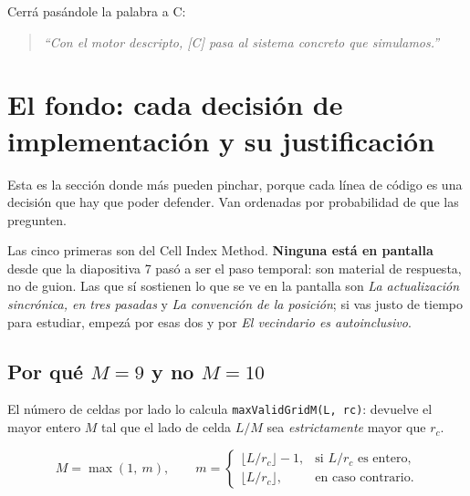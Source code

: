 \documentclass[11pt]{article}
\begin{document}


Cerrá pasándole la palabra a C:

\begin{quote}
\itshape
``Con el motor descripto, [C] pasa al sistema concreto que simulamos.''
\end{quote}

\section{El fondo: cada decisión de implementación y su justificación}

Esta es la sección donde más pueden pinchar, porque cada línea de código es una
decisión que hay que poder defender. Van ordenadas por probabilidad de que las
pregunten.

Las cinco primeras son del Cell Index Method. \textbf{Ninguna está en pantalla}
desde que la diapositiva 7 pasó a ser el paso temporal: son material de
respuesta, no de guion. Las que sí sostienen lo que se ve en la pantalla son
\emph{La actualización sincrónica, en tres pasadas} y \emph{La convención de la
posición}; si vas justo de tiempo para estudiar, empezá por esas dos y por
\emph{El vecindario es autoinclusivo}.

\subsection{Por qué $M = 9$ y no $M = 10$}

El número de celdas por lado lo calcula \texttt{maxValidGridM(L, rc)}: devuelve
el mayor entero $M$ tal que el lado de celda $L/M$ sea \emph{estrictamente}
mayor que $r_c$.

\[
  M = \max(1,\ m), \qquad
  m = \begin{cases}
    \lfloor L/r_c \rfloor - 1, & \text{si } L/r_c \text{ es entero,} \\
    \lfloor L/r_c \rfloor,     & \text{en caso contrario.}
  \end{cases}
\]
\end{document}
